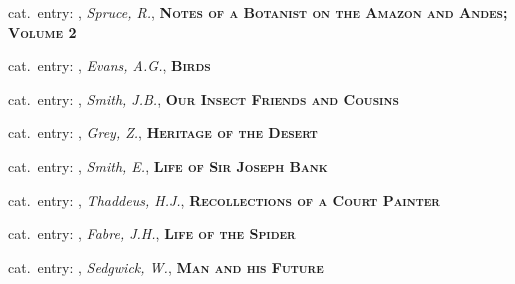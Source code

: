 \vbox{%
  \vspace*{0.5 cm}
  \noindent
  {\footnotesize{}\hspace{1em}cat.~entry: , \textit{Spruce, R.}, \textsc{\bfseries Notes of a Botanist on the Amazon and Andes; Volume 2}}
}

\vbox{%
  \vspace*{0.5 cm}
  \noindent
  {\footnotesize{}\hspace{1em}cat.~entry: , \textit{Evans, A.G.}, \textsc{\bfseries Birds}}
}

\vbox{%
  \vspace*{0.5 cm}
  \noindent
  {\footnotesize{}\hspace{1em}cat.~entry: , \textit{Smith, J.B.}, \textsc{\bfseries Our Insect Friends and Cousins}}
}

\vbox{%
  \vspace*{0.5 cm}
  \noindent
  {\footnotesize{}\hspace{1em}cat.~entry: , \textit{Grey, Z.}, \textsc{\bfseries Heritage of the Desert}}
}

\vbox{%
  \vspace*{0.5 cm}
  \noindent
  {\footnotesize{}\hspace{1em}cat.~entry: , \textit{Smith, E.}, \textsc{\bfseries Life of Sir Joseph Bank}}
}

\vbox{%
  \vspace*{0.5 cm}
  \noindent
  {\footnotesize{}\hspace{1em}cat.~entry: , \textit{Thaddeus, H.J.}, \textsc{\bfseries Recollections of a Court Painter}}
}

\vbox{%
  \vspace*{0.5 cm}
  \noindent
  {\footnotesize{}\hspace{1em}cat.~entry: , \textit{Fabre, J.H.}, \textsc{\bfseries Life of the Spider}}
}

\vbox{%
  \vspace*{0.5 cm}
  \noindent
  {\footnotesize{}\hspace{1em}cat.~entry: , \textit{Sedgwick, W.}, \textsc{\bfseries Man and his Future}}
}

